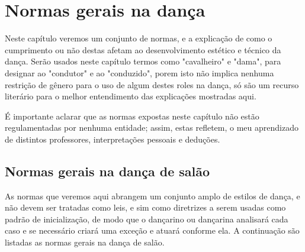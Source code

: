 
\chapter{Normas gerais na dança}
Neste capítulo veremos um conjunto de normas, e a explicação de como o cumprimento
ou não destas afetam ao desenvolvimento estético e técnico da dança. Serão usados
neste capítulo termos como "cavalheiro" e "dama", para designar ao "condutor" e ao "conduzido",
porem isto não implica nenhuma restrição de gênero para o uso de algum destes roles na dança,
só são um recurso literário para o melhor entendimento das explicações mostradas aqui.
\begin{lattention}
É importante aclarar
que as normas expostas neste capítulo não estão regulamentadas por nenhuma entidade; assim, estas
refletem, o meu aprendizado de distintos professores,
interpretações pessoais  e deduções. 
\end{lattention}

\section{Normas gerais na dança de salão}
As normas que veremos aqui abrangem um conjunto amplo de estilos de 
dança, e não devem ser
tratadas como leis, e sim como diretrizes a serem usadas como padrão de inicialização, de modo que 
o dançarino ou dançarina analisará cada caso e se necessário criará uma exceção e atuará conforme ela.
A continuação são listadas as normas gerais na dança de salão.\\

